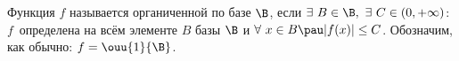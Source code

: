 
 	Функция $f$ называется органиченной по базе $\B$, если 
 	$\exists\  B\in\B, \ \exists\  C \in(0, +\infty)$\textup{:} $f$~определена на всём элементе $B$ базы $\B$ и $\forall\  x\in B\pau |f(x)|\leq C$.
 	Обозначим, как обычно: $f= \ouu{1}{\B}$.
 